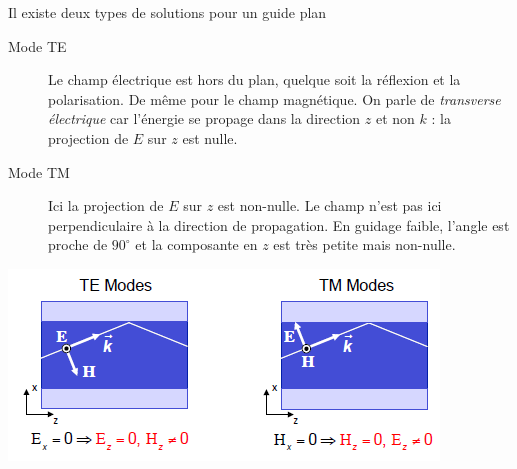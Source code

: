 Il existe deux types de solutions pour un guide plan
\begin{description}
\item[Mode TE] Le champ électrique est hors du plan, quelque soit la réflexion et la polarisation. 
De même pour le champ magnétique. On parle de \textit{transverse électrique} car l'énergie se propage
dans la direction $z$ et non $k$ : la projection de $E$ sur $z$ est nulle.
\item[Mode TM] Ici la projection de $E$ sur $z$ est non-nulle. Le champ n'est pas ici perpendiculaire à la direction de propagation. En guidage faible, l'angle est proche de $90^\circ$ et la composante
en $z$ est très petite mais non-nulle.
\end{description}

\begin{center}
	\includegraphics[scale=0.75]{ch1/image12.png}
\end{center}



